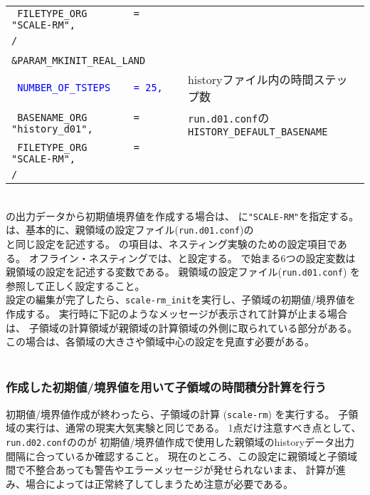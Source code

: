 {{{\begin{tabularx}{150mm}{lX}
\verb| FILETYPE_ORG        = "SCALE-RM",| & \\
\verb|/| &\\
 & \\
\verb|&PARAM_MKINIT_REAL_LAND| &\\
\textcolor{blue}{\verb| NUMBER_OF_TSTEPS    = 25,|}         & historyファイル内の時間ステップ数\\
\verb| BASENAME_ORG        = "history_d01",|  & \verb|run.d01.conf|の\verb|HISTORY_DEFAULT_BASENAME|\\
\verb| FILETYPE_ORG        = "SCALE-RM",| & \\
\verb|/| &\\
\end{tabularx}
}}}\\


\scalerm の出力データから初期値境界値を作成する場合は、
に\verb|"SCALE-RM"|を指定する。
は、基本的に、親領域の設定ファイル(\verb|run.d01.conf|)の\\
と同じ設定を記述する。
%
の項目は、ネスティング実験のための設定項目である。
オフライン・ネスティングでは、と設定する。
 で始まる6つの設定変数は親領域の設定を記述する変数である。
親領域の設定ファイル(\verb|run.d01.conf|) を参照して正しく設定すること。\\


設定の編集が完了したら、\verb|scale-rm_init|を実行し、子領域の初期値/境界値を作成する。
実行時に下記のようなメッセージが表示されて計算が止まる場合は、
子領域の計算領域が親領域の計算領域の外側に取られている部分がある。
この場合は、各領域の大きさや領域中心の設定を見直す必要がある。\\

\\



\subsubsection{作成した初期値/境界値を用いて子領域の時間積分計算を行う}
初期値/境界値作成が終わったら、子領域の計算 (\verb|scale-rm|) を実行する。
子領域の実行は、通常の現実大気実験と同じである。
1点だけ注意すべき点として、
\verb|run.d02.conf|ののが
初期値/境界値作成で使用した親領域のhistoryデータ出力間隔に合っているか確認すること。
現在のところ、この設定に親領域と子領域間で不整合あっても警告やエラーメッセージが発せられないまま、
計算が進み、場合によっては正常終了してしまうため注意が必要である。


